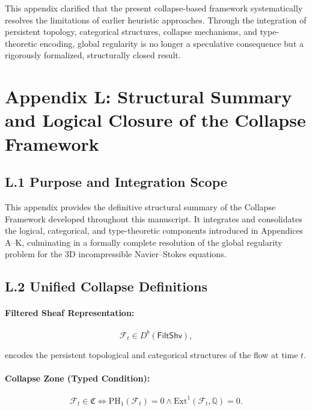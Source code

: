 \documentclass[11pt]{article}
\begin{document}
This appendix clarified that the present collapse-based framework systematically resolves the limitations of earlier heuristic approaches.  
Through the integration of persistent topology, categorical structures, collapse mechanisms, and type-theoretic encoding, global regularity is no longer a speculative consequence but a rigorously formalized, structurally closed result.



\section*{Appendix L: Structural Summary and Logical Closure of the Collapse Framework}

\subsection*{L.1 Purpose and Integration Scope}

This appendix provides the definitive structural summary of the Collapse Framework developed throughout this manuscript.  
It integrates and consolidates the logical, categorical, and type-theoretic components introduced in Appendices A–K, culminating in a formally complete resolution of the global regularity problem for the 3D incompressible Navier–Stokes equations.

\subsection*{L.2 Unified Collapse Definitions}

\paragraph{Filtered Sheaf Representation:}

\[
\mathcal{F}_t \in D^b(\mathsf{FiltShv}),
\]

encodes the persistent topological and categorical structures of the flow at time \( t \).

\paragraph{Collapse Zone (Typed Condition):}

\[
\mathcal{F}_t \in \mathfrak{C} \iff
\mathrm{PH}_1(\mathcal{F}_t) = 0 \land \mathrm{Ext}^1(\mathcal{F}_t, \mathbb{Q}) = 0.
\]
\end{document}
